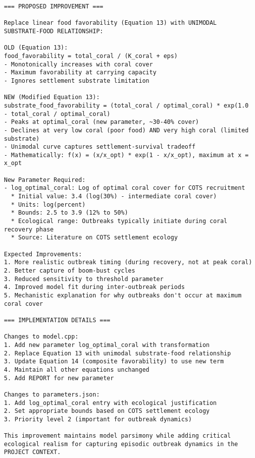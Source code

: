 \begin{lstlisting}
=== PROPOSED IMPROVEMENT ===

Replace linear food favorability (Equation 13) with UNIMODAL SUBSTRATE-FOOD RELATIONSHIP:

OLD (Equation 13):
food_favorability = total_coral / (K_coral + eps)
- Monotonically increases with coral cover
- Maximum favorability at carrying capacity
- Ignores settlement substrate limitation

NEW (Modified Equation 13):
substrate_food_favorability = (total_coral / optimal_coral) * exp(1.0 - total_coral / optimal_coral)
- Peaks at optimal_coral (new parameter, ~30-40% cover)
- Declines at very low coral (poor food) AND very high coral (limited substrate)
- Unimodal curve captures settlement-survival tradeoff
- Mathematically: f(x) = (x/x_opt) * exp(1 - x/x_opt), maximum at x = x_opt

New Parameter Required:
- log_optimal_coral: Log of optimal coral cover for COTS recruitment
  * Initial value: 3.4 (log(30%) - intermediate coral cover)
  * Units: log(percent)
  * Bounds: 2.5 to 3.9 (12% to 50%)
  * Ecological range: Outbreaks typically initiate during coral recovery phase
  * Source: Literature on COTS settlement ecology

Expected Improvements:
1. More realistic outbreak timing (during recovery, not at peak coral)
2. Better capture of boom-bust cycles
3. Reduced sensitivity to threshold parameter
4. Improved model fit during inter-outbreak periods
5. Mechanistic explanation for why outbreaks don't occur at maximum coral cover

=== IMPLEMENTATION DETAILS ===

Changes to model.cpp:
1. Add new parameter log_optimal_coral with transformation
2. Replace Equation 13 with unimodal substrate-food relationship
3. Update Equation 14 (composite favorability) to use new term
4. Maintain all other equations unchanged
5. Add REPORT for new parameter

Changes to parameters.json:
1. Add log_optimal_coral entry with ecological justification
2. Set appropriate bounds based on COTS settlement ecology
3. Priority level 2 (important for outbreak dynamics)

This improvement maintains model parsimony while adding critical ecological realism for capturing episodic outbreak dynamics in the PROJECT CONTEXT.
\end{lstlisting}

